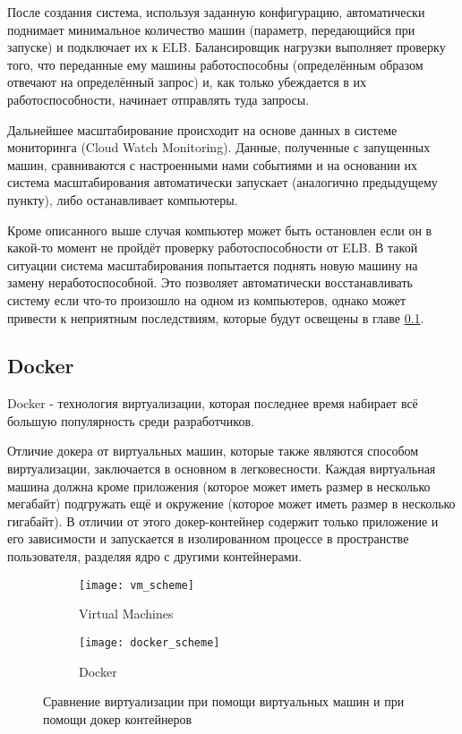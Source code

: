 	После создания система, используя заданную конфигурацию, автоматически поднимает минимальное количество машин (параметр, передающийся при запуске) и подключает их к ELB. Балансировщик нагрузки выполняет проверку того, что переданные ему машины работоспособны (определённым образом отвечают на определённый запрос) и, как только убеждается в их работоспособности, начинает отправлять туда запросы.
	
	Дальнейшее масштабирование происходит на основе данных в системе мониторинга (Cloud Watch Monitoring). Данные, полученные с запущенных машин, сравниваются с настроенными нами событиями и на основании их система масштабирования автоматически  запускает (аналогично предыдущему пункту), либо останавливает компьютеры.
	
	Кроме описанного выше случая компьютер может быть остановлен если он в какой-то момент не пройдёт проверку работоспособности от ELB. В такой ситуации система масштабирования попытается поднять новую машину на замену неработоспособной. Это позволяет автоматически восстанавливать систему если что-то произошло на одном из компьютеров, однако может привести к неприятным последствиям, которые будут освещены в главе \ref{}.

\subsection{Docker}

	Docker - технология виртуализации, которая последнее время набирает всё большую популярность среди разработчиков. 
	
	Отличие докера от виртуальных машин, которые также являются способом виртуализации, заключается в основном в легковесности. Каждая виртуальная машина должна кроме приложения (которое может иметь размер в несколько мегабайт) подгружать ещё и окружение (которое может иметь размер в несколько гигабайт). В отличии от этого докер-контейнер содержит только приложение и его зависимости и запускается в изолированном процессе в пространстве пользователя, разделяя ядро с другими контейнерами.
\begin{figure}[h]
	\centering
	\begin{subfigure}[b]{.5\textwidth}
  		\texttt{[image: vm\_scheme]}
  		\caption{Virtual Machines}
  		\label{fig:sub1}
	\end{subfigure}%
	\begin{subfigure}[b]{.5\textwidth}
  		\texttt{[image: docker\_scheme]}
  		\caption{Docker}
  		\label{fig:sub2}
	\end{subfigure}
	\caption{Сравнение виртуализации при помощи виртуальных машин и при помощи докер контейнеров}
	\label{fig:test}
\end{figure}

